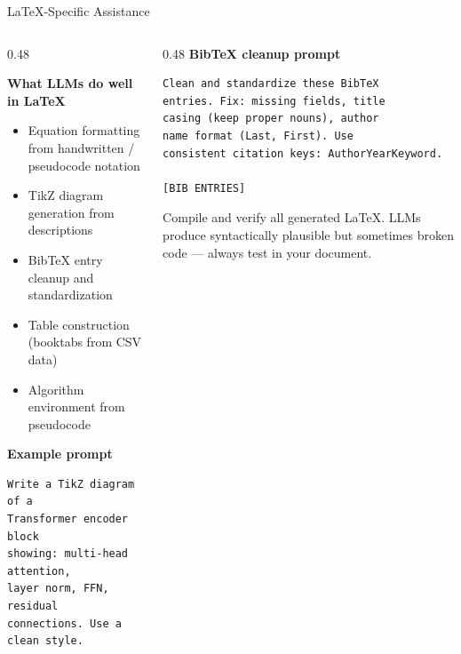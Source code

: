 \begin{frame}[fragile]{LaTeX-Specific Assistance}
  \begin{columns}[T, onlytextwidth]
    \begin{column}{0.48\textwidth}
      {\small
      \textbf{What LLMs do well in LaTeX}\\[0.2em]
      \begin{itemize}
        \item Equation formatting from handwritten / pseudocode notation
        \item TikZ diagram generation from descriptions
        \item BibTeX entry cleanup and standardization
        \item Table construction (booktabs from CSV data)
        \item Algorithm environment from pseudocode
      \end{itemize}
      \vspace{0.3em}
      \textbf{Example prompt}\\[0.2em]}
      \begin{lstlisting}[language={}, numbers=none, basicstyle=\ttfamily\scriptsize]
Write a TikZ diagram of a
Transformer encoder block
showing: multi-head attention,
layer norm, FFN, residual
connections. Use a clean style.
      \end{lstlisting}
    \end{column}
    \hfill
    \begin{column}{0.48\textwidth}
      {\small\textbf{BibTeX cleanup prompt}\\[0.2em]}
      \begin{lstlisting}[language={}, numbers=none, basicstyle=\ttfamily\scriptsize]
Clean and standardize these BibTeX
entries. Fix: missing fields, title
casing (keep proper nouns), author
name format (Last, First). Use
consistent citation keys: AuthorYearKeyword.

[BIB ENTRIES]
      \end{lstlisting}
      \vspace{0.3em}
      {\small\alert{Compile and verify all generated LaTeX.} LLMs produce syntactically plausible but sometimes broken code — always test in your document.}
    \end{column}
  \end{columns}
\end{frame}

